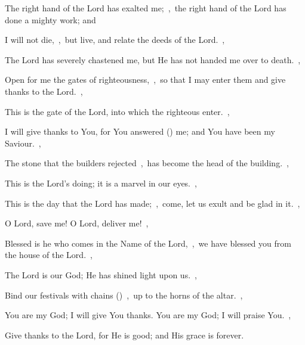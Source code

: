 \documentclass[12pt,twoside,a5paper]{article}
\begin{document}
\begin{normalparskip}
  The right hand of the Lord has exalted me;~\sep\ the right hand of the Lord has done a mighty work; and

  I will not die,~\sep\ but live, and relate the deeds of the Lord.~\sep

  The Lord has severely chastened me, but He has not handed me over to death.~\sep

  Open for me the gates of righteousness,~\sep\ so that I may enter them and give thanks to the Lord.~\sep

  This is the gate of the Lord, into which the righteous enter.~\sep

  I will give thanks to You, for You answered () me; and You have been my Saviour.~\sep

  The stone that the builders rejected~\sep\ has become the head of the building.~\sep

  This is the Lord's doing; it is a marvel in our eyes.~\sep

  This is the day that the Lord has made;~\sep\ come, let us exult and be glad in it.~\sep

  O Lord, save me! O Lord, deliver me!~\sep

  Blessed is he who comes in the Name of the Lord,~\sep\ we have blessed you from the house of the Lord.~\sep

  The Lord is our God; He has shined light upon us.~\sep

  Bind our festivals with chains ()~\sep\ up to the horns of the altar.~\sep

  You are my God; I will give You thanks. You are my God; I will praise You.~\sep

  Give thanks to the Lord, for He is good; and His grace is forever.
\end{normalparskip}



\end{document}
